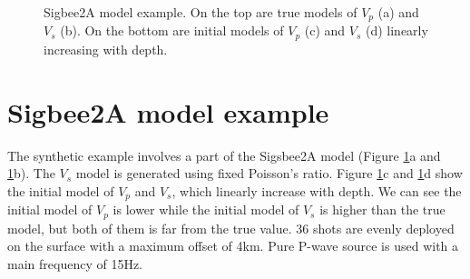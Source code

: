 \begin{figure}
   \centering
   \caption{Sigbee2A model example. On the top are true models of 
   $V_p$ (a) and $V_s$ (b). On the bottom are initial models of $V_p$ (c) and $V_s$
   (d) linearly increasing with depth. }
   \label{fig:TrueAndInitial}
\end{figure}

\section{Sigbee2A model example}
The synthetic example involves a part of the Sigsbee2A model (Figure
\ref{fig:TrueAndInitial}a and \ref{fig:TrueAndInitial}b).
The $V_s$ model is generated using fixed Poisson's ratio. Figure
\ref{fig:TrueAndInitial}c and \ref{fig:TrueAndInitial}d show the initial model of
$V_p$ and $V_s$, which linearly increase with depth. We can see the initial
model of $V_p$ is lower while the initial model of $V_s$ is higher than the true model, but both of
them is far from the true value. 36 shots are evenly deployed on the surface with
a maximum offset of 4km. Pure P-wave source is used with a main frequency of 15Hz.

